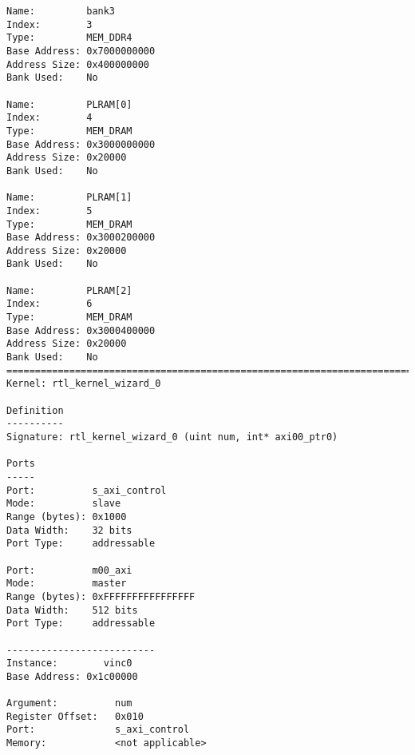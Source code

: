\begin{lstlisting}[label=lst:lev_rec,caption=Содержимое xclbin.info-файла]
Name:         bank3
Index:        3
Type:         MEM_DDR4
Base Address: 0x7000000000
Address Size: 0x400000000
Bank Used:    No

Name:         PLRAM[0]
Index:        4
Type:         MEM_DRAM
Base Address: 0x3000000000
Address Size: 0x20000
Bank Used:    No

Name:         PLRAM[1]
Index:        5
Type:         MEM_DRAM
Base Address: 0x3000200000
Address Size: 0x20000
Bank Used:    No

Name:         PLRAM[2]
Index:        6
Type:         MEM_DRAM
Base Address: 0x3000400000
Address Size: 0x20000
Bank Used:    No
==============================================================================
Kernel: rtl_kernel_wizard_0

Definition
----------
Signature: rtl_kernel_wizard_0 (uint num, int* axi00_ptr0)

Ports
-----
Port:          s_axi_control
Mode:          slave
Range (bytes): 0x1000
Data Width:    32 bits
Port Type:     addressable

Port:          m00_axi
Mode:          master
Range (bytes): 0xFFFFFFFFFFFFFFFF
Data Width:    512 bits
Port Type:     addressable

--------------------------
Instance:        vinc0
Base Address: 0x1c00000

Argument:          num
Register Offset:   0x010
Port:              s_axi_control
Memory:            <not applicable>


\end{lstlisting}
